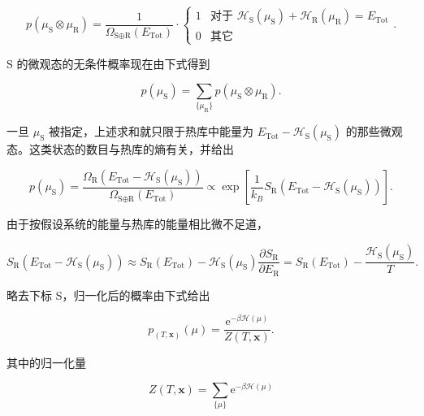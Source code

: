 \begin{equation}\label{eq:4.52}
  p(\mu_{\text{S}}\otimes\mu_{\text{R}})=\frac{1}{\Omega_{\text{S}\oplus\text{R}}(E_{\text{Tot}})}\cdot
  \begin{cases}1 & \text{对于 }\mathscr H_{\text{S}}(\mu_{\text{S}})+\mathscr H_{\text{R}}(\mu_{\text{R}})=E_{\text{Tot}}\\ 0 & \text{其它}\end{cases}.
\end{equation}


S 的微观态的无条件概率现在由下式得到

\begin{equation}\label{eq:4.53}
  p(\mu_{\text{S}})=\sum_{\{\mu_{\text{R}}\}}p(\mu_{\text{S}}\otimes\mu_{\text{R}}).
\end{equation}

一旦 $\mu_{\text{S}}$ 被指定，上述求和就只限于热库中能量为 $E_{\text{Tot}}-\mathscr H_{\text{S}}(\mu_{\text{S}})$ 的那些微观态。这类状态的数目与热库的熵有关，并给出

\begin{equation}\label{eq:4.54}
  p(\mu_{\text{S}})=\frac{\Omega_{\text{R}}(E_{\text{Tot}}-\mathscr H_{\text{S}}(\mu_{\text{S}}))}{\Omega_{\text{S}\oplus\text{R}}(E_{\text{Tot}})}\propto\exp\left[\frac{1}{k_B}S_{\text{R}}(E_{\text{Tot}}-\mathscr H_{\text{S}}(\mu_{\text{S}}))\right].
\end{equation}

由于按假设系统的能量与热库的能量相比微不足道，

\begin{equation}\label{eq:4.55}
  S_{\text{R}}(E_{\text{Tot}}-\mathscr H_{\text{S}}(\mu_{\text{S}}))\approx S_{\text{R}}(E_{\text{Tot}})-\mathscr H_{\text{S}}(\mu_{\text{S}})\frac{\partial S_{\text{R}}}{\partial E_{\text{R}}}=S_{\text{R}}(E_{\text{Tot}})-\frac{\mathscr H_{\text{S}}(\mu_{\text{S}})}{T}.
\end{equation}

略去下标 S，归一化后的概率由下式给出

\begin{equation}\label{eq:4.56}
  p_{(T,\mathbf x)}(\mu)=\frac{\mathrm{e}^{-\beta\mathscr H(\mu)}}{Z(T,\mathbf x)}.
\end{equation}

其中的归一化量

\begin{equation}\label{eq:4.57}
  Z(T,\mathbf x)=\sum_{\{\mu\}}\mathrm{e}^{-\beta\mathscr H(\mu)}
\end{equation}

